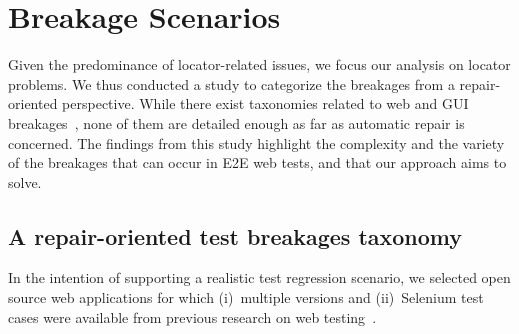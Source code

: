 
\section{Breakage Scenarios}\label{sec:study}

Given the predominance of locator-related issues, we focus our analysis on locator problems. We thus conducted a study to categorize the breakages from a repair-oriented perspective. 
While there exist taxonomies related to web and GUI breakages~\cite{Hammoudi-2016-ICST,Issa:2012:VTG:2412102.2412107,7102582}, none of them are detailed enough as far as automatic repair is concerned. 
The findings from this study highlight the complexity and the variety of the breakages that can occur in E2E web tests, and that our approach aims to solve.

\subsection{A repair-oriented test breakages taxonomy}\label{sec:taxonomy}

\label{sec:study}
In the intention of supporting a realistic test regression scenario, we selected open source web applications for which (i)~multiple versions and (ii)~Selenium test cases were available from previous research on web testing~\cite{WCRE}. %

